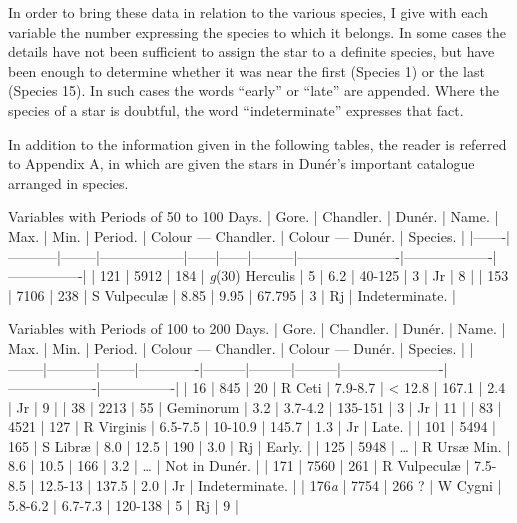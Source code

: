 \documentclass[a4paper, 12pt, oneside, polutonikogreek, english]{article}
\begin{document}
In order to bring these data in relation to the various species, I give with each variable the number expressing the species to which it belongs. In some cases the details have not been sufficient to assign the star to a definite species, but have been enough to determine whether it was near the first (Species 1) or the last (Species 15). In such cases the words ``early'' or ``late'' are appended. Where the species of a star is doubtful, the word ``indeterminate'' expresses that fact.

In addition to the information given in the following tables, the reader is referred to Appendix A, in which are given the stars in Dunér's important catalogue arranged in species.

Variables with Periods of 50 to 100 Days. 
| Gore. | Chandler. | Dunér. | Name.      | Max. | Min. | Period. | Colour --- Chandler. | Colour --- Dunér. | Species.    |
|-------|-----------|--------|------------------|------|------|---------|----------------------|-------------------|----------------|
| 121  | 5912   | 184  | \emph{g}(30) Herculis | 5  | 6.2 | 40-125 | 3          | Jr        | 8       |
| 153  | 7106   | 238  | S Vulpeculæ   | 8.85 | 9.95 | 67.795 | 3          | Rj        | Indeterminate. |

Variables with Periods of 100 to 200 Days. 
| Gore. | Chandler. | Dunér. | Name.    | Max.  | Min.  | Period. | Colour --- Chandler. | Colour --- Dunér. | Species.    |
|--------|-----------|--------|-------------|---------|---------|---------|----------------------|-------------------|----------------|
| 16   | 845    | 20   | R Ceti   | 7.9-8.7 | < 12.8 | 167.1  | 2.4         | Jr        | 9       |
| 38   | 2213   | 55   | Geminorum  | 3.2   | 3.7-4.2 | 135-151 | 3          | Jr        | 11       |
| 83   | 4521   | 127  | R Virginis | 6.5-7.5 | 10-10.9 | 145.7  | 1.3         | Jr        | Late.     |
| 101  | 5494   | 165  | S Libræ   | 8.0   | 12.5  | 190   | 3.0         | Rj        | Early.     |
| 125  | 5948   | …   | R Ursæ Min. | 8.6   | 10.5  | 166   | 3.2         | …         | Not in Dunér. |
| 171  | 7560   | 261  | R Vulpeculæ | 7.5-8.5 | 12.5-13 | 137.5  | 2.0         | Jr        | Indeterminate. |
| 176\emph{a} | 7754   | 266 ? | W Cygni   | 5.8-6.2 | 6.7-7.3 | 120-138 | 5          | Rj        | 9       |
\end{document}
